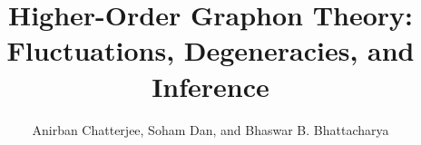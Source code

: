 \documentclass[11pt,reqno]{amsart}
\numberwithin{equation}{section}
\theoremstyle{definition}
\begin{document}
\title[ Higher-Order Graphon Theory ]{ Higher-Order Graphon Theory: Fluctuations, Degeneracies, and Inference }
\author[Chatterjee, Dan, and Bhattacharya ]{Anirban Chatterjee, Soham Dan, and Bhaswar B. Bhattacharya}
\address{Department of Statistics\\ University of Pennsylvania\\ Philadelphia\\ PA 19104\\ United States}
\address{IBM Research\\ Yorktown Heights\\ NY 10598\\ United States}
\address{Department of Statistics\\ University of Pennsylvania\\ Philadelphia\\ PA 19104\\ United States}



\end{document}
